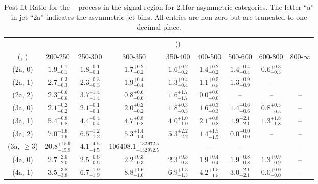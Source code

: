 \begin{table}[h!]
\tiny
\centering
\caption{Post fit Ratio for the \zInv~ process in the signal region for 2.1\ifb for asymmetric categories. The letter ``a'' in jet \eg ``2a''  indicates the asymmetric jet bins. All entries are non-zero but are truncated to one decimal place.\label{tab:ratioseppost_sig_zinv_asym}}
\begin{tabular}
{ccccccccc}
	\hline\hline
	& \multicolumn{8}{c}{\scalht (\gev)} \\ 
	 (\njet,  \nb) & 200-250 & 250-300 & 300-350 & 350-400 & 400-500 & 500-600 & 600-800 & 800-$\infty$ \\ [0.8ex] 
\hline
	(2a, 0) & $1.9^{+ 0.1 }_{- 0.1 }$ & $1.8^{+ 0.1 }_{- 0.1 }$ & $1.7^{+ 0.2 }_{- 0.2 }$ & $1.6^{+ 0.2 }_{- 0.2 }$ & $1.4^{+ 0.2 }_{- 0.2 }$ & $1.4^{+ 0.4 }_{- 0.4 }$ & $0.6^{+ 0.3 }_{- 0.3 }$ & -- \\[0.5ex] 
	(2a, 1) & $2.7^{+ 0.3 }_{- 0.3 }$ & $2.3^{+ 0.3 }_{- 0.3 }$ & $1.9^{+ 0.4 }_{- 0.4 }$ & $1.3^{+ 0.4 }_{- 0.4 }$ & $1.1^{+ 0.5 }_{- 0.5 }$ & $1.3^{+ 0.9 }_{- 0.9 }$ & -- & -- \\[0.5ex] 
	(2a, 2) & $2.3^{+ 0.6 }_{- 0.6 }$ & $3.7^{+ 1.4 }_{- 1.4 }$ & $0.8^{+ 0.6 }_{- 0.6 }$ & $1.6^{+ 1.7 }_{- 1.7 }$ & $0.0^{+ 0.0 }_{- 0.0 }$ & -- & -- & -- \\[0.5ex] 
	(3a, 0) & $2.1^{+ 0.2 }_{- 0.2 }$ & $2.1^{+ 0.1 }_{- 0.1 }$ & $2.0^{+ 0.2 }_{- 0.2 }$ & $1.8^{+ 0.3 }_{- 0.3 }$ & $1.6^{+ 0.3 }_{- 0.3 }$ & $1.4^{+ 0.6 }_{- 0.6 }$ & $0.8^{+ 0.5 }_{- 0.5 }$ & -- \\[0.5ex] 
	(3a, 1) & $5.4^{+ 0.8 }_{- 0.8 }$ & $4.4^{+ 0.4 }_{- 0.4 }$ & $4.7^{+ 0.8 }_{- 0.8 }$ & $4.0^{+ 1.0 }_{- 1.0 }$ & $2.1^{+ 0.8 }_{- 0.8 }$ & $1.9^{+ 2.1 }_{- 2.1 }$ & $1.3^{+ 1.8 }_{- 1.8 }$ & -- \\[0.5ex] 
	(3a, 2) & $7.0^{+ 1.6 }_{- 1.6 }$ & $6.5^{+ 1.2 }_{- 1.2 }$ & $5.3^{+ 1.4 }_{- 1.4 }$ & $5.3^{+ 2.2 }_{- 2.2 }$ & $1.4^{+ 1.5 }_{- 1.5 }$ & $0.0^{+ 0.0 }_{- 0.0 }$ & -- & -- \\[0.5ex] 
	(3a, $\ge3$) & $20.8^{+ 15.9 }_{- 15.9 }$ & $4.1^{+ 4.5 }_{- 4.5 }$ & $106408.1^{+ 132972.5 }_{- 132972.5 }$ & -- & -- & -- & -- & -- \\[0.5ex] 
	(4a, 0) & $2.7^{+ 2.0 }_{- 2.0 }$ & $2.5^{+ 0.6 }_{- 0.6 }$ & $2.2^{+ 0.3 }_{- 0.3 }$ & $2.3^{+ 0.3 }_{- 0.3 }$ & $1.9^{+ 0.4 }_{- 0.4 }$ & $1.9^{+ 0.8 }_{- 0.8 }$ & $1.3^{+ 0.9 }_{- 0.9 }$ & -- \\[0.5ex] 
	(4a, 1) & $3.5^{+ 3.8 }_{- 3.8 }$ & $6.7^{+ 1.9 }_{- 1.9 }$ & $8.8^{+ 1.6 }_{- 1.6 }$ & $6.9^{+ 1.3 }_{- 1.3 }$ & $4.2^{+ 1.5 }_{- 1.5 }$ & $3.0^{+ 2.1 }_{- 2.1 }$ & $0.0^{+ 0.0 }_{- 0.0 }$ & -- \\[0.5ex] 

\end{tabular}
\end{table}
